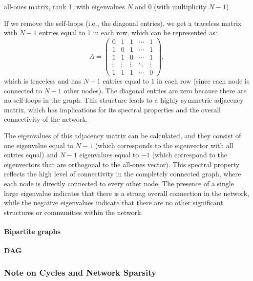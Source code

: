 all-ones matrix, rank 1, with eigenvalues \(N\) and 0 (with multiplicity \(N-1\))

If we remove the self-loops (i.e., the diagonal entries), we get a traceless matrix with \(N-1\) entries equal to 1 in each row, which can be represented as:
\[
    A = \begin{pmatrix}
        0      & 1      & 1      & \cdots & 1      \\
        1      & 0      & 1      & \cdots & 1      \\
        1      & 1      & 0      & \cdots & 1      \\
        \vdots & \vdots & \vdots & \ddots & \vdots \\
        1      & 1      & 1      & \cdots & 0
    \end{pmatrix},
\]
which is traceless and has \(N-1\) entries equal to 1 in each row (since each node is connected to \(N-1\) other nodes). The diagonal entries are zero because there are no self-loops in the graph. This structure leads to a highly symmetric adjacency matrix, which has implications for its spectral properties and the overall connectivity of the network.

The eigenvalues of this adjacency matrix can be calculated, and they consist of one eigenvalue equal to \(N-1\) (which corresponds to the eigenvector with all entries equal) and \(N-1\) eigenvalues equal to \(-1\) (which correspond to the eigenvectors that are orthogonal to the all-ones vector). This spectral property reflects the high level of connectivity in the completely connected graph, where each node is directly connected to every other node. The presence of a single large eigenvalue indicates that there is a strong overall connection in the network, while the negative eigenvalues indicate that there are no other significant structures or communities within the network.

\paragraph{Bipartite graphs}

\paragraph{DAG}

\subsubsection{Note on Cycles and Network Sparsity}

